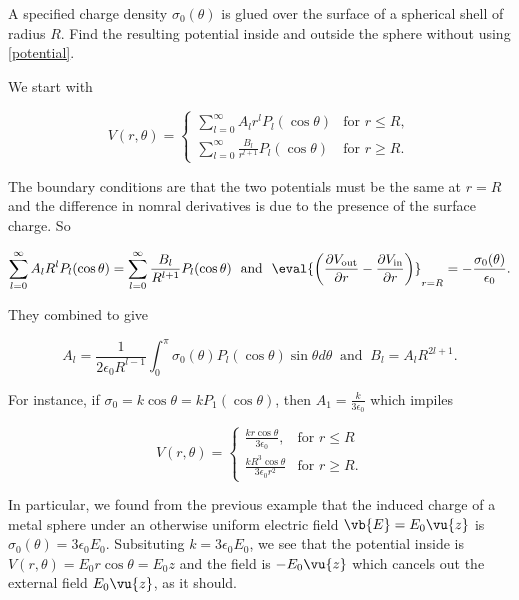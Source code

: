 \documentclass[english,a4paper,12pt]{report}
\begin{document}
{A specified charge density \(\sigma_0(\theta)\) is glued over the surface of a spherical shell of radius \(R\). Find the resulting potential inside and outside the sphere without using \cref{potential}.}
{We start with 

\begin{equation}
     V(r, \theta) =
    \begin{cases}
    \displaystyle \sum_{l=0}^{\infty} A_{l}r^{l}P_{l}(\cos \theta )    & \text{for } r \leq R, \\[10pt]
    \displaystyle \sum_{l=0}^{\infty} \frac{B_{l} }{r^{l+1} } P_{l}(\cos \theta ) & \text{for } r \geq R.
    \end{cases}  
\end{equation}

The boundary conditions are that the two potentials must be the same at \(r = R\) and the difference in nomral derivatives is due to the presence of the surface charge. So

\begin{equation}
    \sum_{l=0}^{\infty} A_{l}R^{l}P_{l}(\cos \theta ) = \sum_{l=0}^{\infty} \frac{B_{l} }{R^{l+1} } P_{l}(\cos \theta ) ~\text { and }~ \eval{\left( \frac{\partial V_{\text{out} } }{\partial r} - \frac{\partial V_{\text{in} } }{\partial r}   \right)}_{r=R}^{} = -\frac{\sigma _{0}(\theta ) }{\epsilon _{0} }.         
\end{equation}

They combined to give 

\begin{equation}
    A_{l} = \frac{1}{2\epsilon _{0}R^{l-1}  } \int_{0}^{\pi } \sigma _{0}(\theta ) P_{l}(\cos \theta ) \sin \theta d \theta ~\text { and }~ B_{l} = A_{l}R^{2l+1}.       
\end{equation}

For instance, if \(\sigma _{0} = k\cos \theta  = kP_1 (\cos \theta )\), then \(\displaystyle A_1 = \frac{k}{3\epsilon _{0} }\) which impiles 

\begin{equation}
      V(r, \theta) =
    \begin{cases}
    \displaystyle \frac{k r \cos\theta}{3 \epsilon_0}, & \text{for } r \leq R \\[10pt]
    \displaystyle \frac{k R^3 \cos\theta}{3 \epsilon_0 r^2} & \text{for } r \geq R.
    \end{cases}  
\end{equation}

In particular, we found from the previous example that the induced charge of a metal sphere under an otherwise uniform electric field \(\vb{E} = E_0 \vu{z} \) is \(\sigma _{0}(\theta ) = 3 \epsilon _{0}E_0   \). Subsituting \(k = 3 \epsilon _{0}E_0  \), we see that the potential inside is \(V(r,\theta ) = E_0 r \cos \theta = E_0 z\) and the field is \(- E_0 \vu{z} \) which cancels out the external field \(E_0 \vu{z} \), as it should.      
} 
\end{document}
